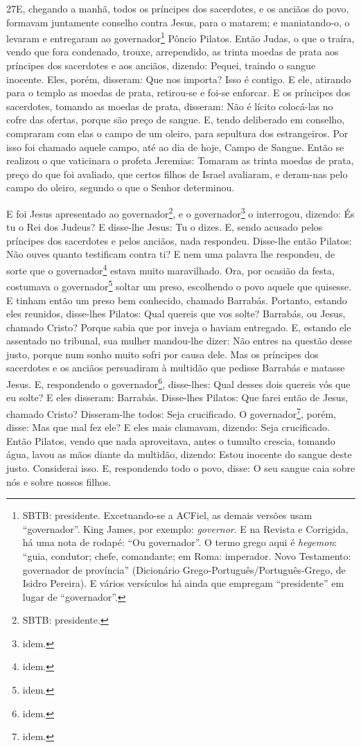 \lettrine{27} E, chegando a manhã, todos os príncipes dos
sacerdotes, e os anciãos do povo, formavam juntamente conselho
contra Jesus, para o matarem; e maniatando-o, o levaram e
entregaram ao governador\footnote{SBTB: presidente. Excetuando-se a
ACFiel, as demais versões usam ``governador''. King James, por
exemplo: \emph{governor}. E na Revista e Corrigida, há uma nota de
rodapé: ``Ou governador''. O termo grego aqui é \emph{hegemon}:
``guia, condutor; chefe, comandante; em Roma: imperador. Novo
Testamento: governador de província'' (Dicionário
Grego-Português/Português-Grego, de Isidro Pereira). E vários
versículos há ainda que empregam ``presidente'' em lugar de
``governador''.} Pôncio Pilatos. Então Judas, o que o traíra,
vendo que fora condenado, trouxe, arrependido, as trinta moedas de
prata aos príncipes dos sacerdotes e aos anciãos, dizendo:
Pequei, traindo o sangue inocente. Eles, porém, disseram: Que nos
importa? Isso é contigo. E ele, atirando para o templo as moedas
de prata, retirou-se e foi-se enforcar. E os príncipes dos
sacerdotes, tomando as moedas de prata, disseram: Não é lícito
colocá-las no cofre das ofertas, porque são preço de sangue. E,
tendo deliberado em conselho, compraram com elas o campo de um
oleiro, para sepultura dos estrangeiros. Por isso foi chamado
aquele campo, até ao dia de hoje, Campo de Sangue. Então se
realizou o que vaticinara o profeta Jeremias: Tomaram as trinta
moedas de prata, preço do que foi avaliado, que certos filhos de
Israel avaliaram, e deram-nas pelo campo do oleiro, segundo o
que o Senhor determinou.

E foi Jesus apresentado ao governador\footnote{SBTB:
presidente.}, e o governador\footnote{idem.} o interrogou, dizendo:
És tu o Rei dos Judeus? E disse-lhe Jesus: Tu o dizes. E,
sendo acusado pelos príncipes dos sacerdotes e pelos anciãos, nada
respondeu. Disse-lhe então Pilatos: Não ouves quanto
testificam contra ti? E nem uma palavra lhe respondeu, de
sorte que o governador\footnote{idem.} estava muito maravilhado.
Ora, por ocasião da festa, costumava o
governador\footnote{idem.} soltar um preso, escolhendo o povo aquele
que quisesse. E tinham então um preso bem conhecido, chamado
Barrabás. Portanto, estando eles reunidos, disse-lhes
Pilatos: Qual quereis que vos solte? Barrabás, ou Jesus, chamado
Cristo? Porque sabia que por inveja o haviam entregado.
E, estando ele assentado no tribunal, sua mulher mandou-lhe
dizer: Não entres na questão desse justo, porque num sonho muito
sofri por causa dele. Mas os príncipes dos sacerdotes e os
anciãos persuadiram à multidão que pedisse Barrabás e matasse Jesus.
E, respondendo o governador\footnote{idem.}, disse-lhes: Qual
desses dois quereis vós que eu solte? E eles disseram: Barrabás.
Disse-lhes Pilatos: Que farei então de Jesus, chamado Cristo?
Disseram-lhe todos: Seja crucificado. O
governador\footnote{idem.}, porém, disse: Mas que mal fez ele? E
eles mais clamavam, dizendo: Seja crucificado. Então Pilatos,
vendo que nada aproveitava, antes o tumulto crescia, tomando água,
lavou as mãos diante da multidão, dizendo: Estou inocente do sangue
deste justo. Considerai isso. E, respondendo todo o povo,
disse: O seu sangue caia sobre nós e sobre nossos filhos.


